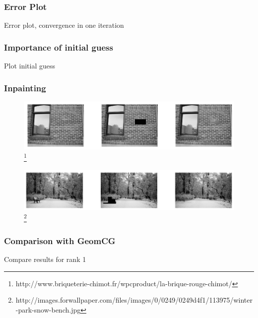 \documentclass{beamer}
\begin{document}
\begin{frame}
\frametitle{Error Plot}
Error plot, convergence in one iteration
\end{frame}

\begin{frame}
\frametitle{Importance of initial guess}
Plot initial guess
\end{frame}

\begin{frame}
\frametitle{Inpainting}
\begin{figure}
\includegraphics[width=1\linewidth]{InpaintingFacade.png}\footnote{\tiny{http://www.briqueterie-chimot.fr/wpcproduct/la-brique-rouge-chimot/}}
\end{figure}
\begin{figure}
\includegraphics[width=1\linewidth]{InpaintingSnow.png}\footnote{\tiny{http://images.forwallpaper.com/files/images/0/0249/0249d4f1/113975/winter-park-snow-bench.jpg}}
\end{figure}
\end{frame}

\begin{frame}
\frametitle{Comparison with GeomCG}
Compare results for rank 1
\end{frame}
\end{document}
